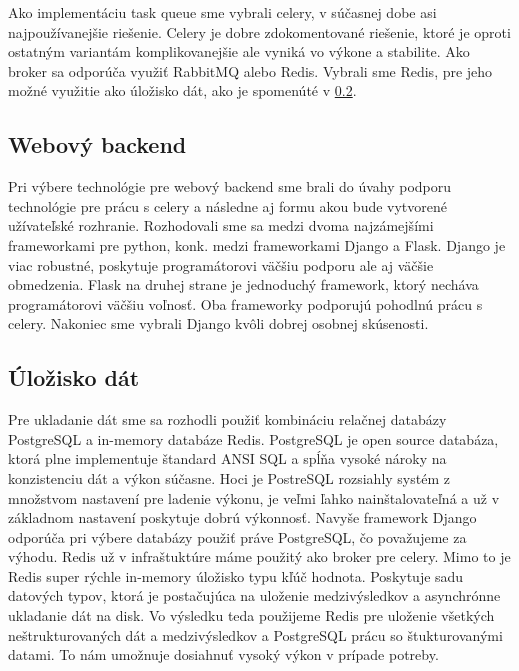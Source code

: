 Ako implementáciu task queue sme vybrali celery, v súčasnej dobe asi najpoužívanejšie riešenie. Celery je dobre zdokomentované riešenie, ktoré je oproti ostatným variantám komplikovanejšie ale vyniká vo výkone a stabilite. Ako broker sa odporúča využiť RabbitMQ alebo Redis. Vybrali sme Redis, pre jeho možné využitie ako úložisko dát, ako je spomenúté v \ref{sec:store}.

\subsection{Webový backend}
Pri výbere technológie pre webový backend sme brali do úvahy podporu technológie pre prácu s celery a následne aj formu akou bude vytvorené užívateľské rozhranie. Rozhodovali sme sa medzi dvoma najzámejšími frameworkami pre python, konk. medzi frameworkami Django a Flask. Django je viac robustné, poskytuje programátorovi väčšiu podporu ale aj väčšie obmedzenia. Flask na druhej strane je jednoduchý framework, ktorý necháva programátorovi väčšiu voľnosť. Oba frameworky podporujú pohodlnú prácu s celery. Nakoniec sme vybrali Django kvôli dobrej osobnej skúsenosti.

\subsection{Úložisko dát}
\label{sec:store}
Pre ukladanie dát sme sa rozhodli použiť kombináciu relačnej databázy PostgreSQL a in-memory databáze Redis. PostgreSQL je open source databáza, ktorá plne implementuje štandard ANSI SQL a spĺňa vysoké nároky na konzistenciu dát a výkon súčasne. Hoci je PostreSQL  rozsiahly systém z množstvom nastavení pre ladenie výkonu, je veľmi ľahko nainštalovateľná a už v základnom nastavení poskytuje dobrú výkonnosť. Navyše framework Django odporúča pri výbere databázy použiť práve PostgreSQL, čo považujeme za výhodu. Redis už v infraštuktúre máme použitý ako broker pre celery. Mimo to je Redis super rýchle in-memory úložisko typu kľúč hodnota. Poskytuje sadu datových typov, ktorá je postačujúca na uloženie medzivýsledkov a asynchrónne ukladanie dát na disk.
Vo výsledku teda použijeme Redis pre uloženie všetkých neštrukturovaných dát a medzivýsledkov a PostgreSQL prácu so štukturovanými datami. To nám umožnuje dosiahnuť vysoký výkon v prípade potreby.

